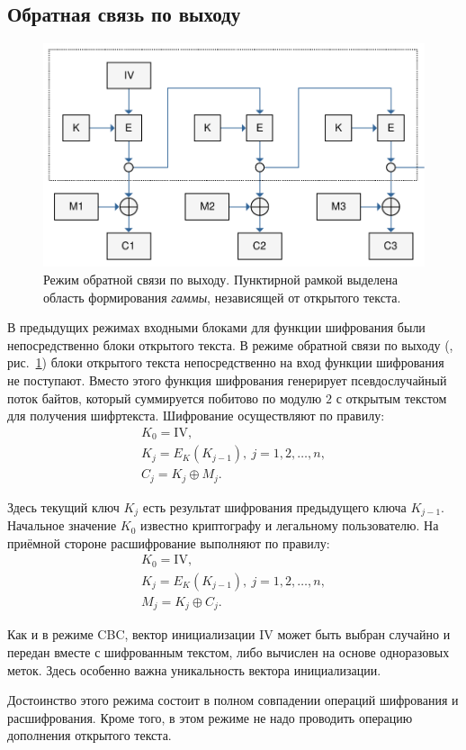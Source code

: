 \subsection{Обратная связь по выходу}

\begin{figure}[bt]
	\centering
	\includegraphics[width=1\textwidth]{pic/OFB}
	\caption{Режим обратной связи по выходу. Пунктирной рамкой выделена область формирования \emph{гаммы}, независящей от открытого текста.}
	\label{fig:OFB}
\end{figure}

В предыдущих режимах входными блоками для функции шифрования были непосредственно блоки открытого текста. В режиме обратной связи по выходу (, рис.~\ref{fig:OFB}) блоки открытого текста непосредственно на вход функции шифрования не поступают. Вместо этого функция шифрования генерирует псевдослучайный поток байтов, который суммируется побитово по модулю $2$ с открытым текстом для получения шифртекста. Шифрование осуществляют по правилу:
\[ \begin{array}{l}
    K_0 = \textrm{IV}, \\
    K_j = E_K(K_{j-1}), ~ j = 1, 2, \dots, n, \\
    C_j = K_j \oplus M_j.
\end{array} \]

Здесь текущий ключ $K_j$ есть результат шифрования предыдущего ключа $K_{j-1}$. Начальное значение $K_0$ известно криптографу и легальному пользователю. На приёмной стороне расшифрование выполняют по правилу:
\[ \begin{array}{l}
    K_0 = \textrm{IV}, \\
    K_j = E_K(K_{j-1}), ~ j = 1, 2, \dots, n, \\
    M_j = K_j \oplus C_j.
\end{array} \]

Как и в режиме CBC, вектор инициализации $\textrm{IV}$ может быть выбран случайно и передан вместе с шифрованным текстом, либо вычислен на основе одноразовых меток. Здесь особенно важна уникальность вектора инициализации.

Достоинство этого режима состоит в полном совпадении операций шифрования и расшифрования. Кроме того, в этом режиме не надо проводить операцию дополнения открытого текста.
